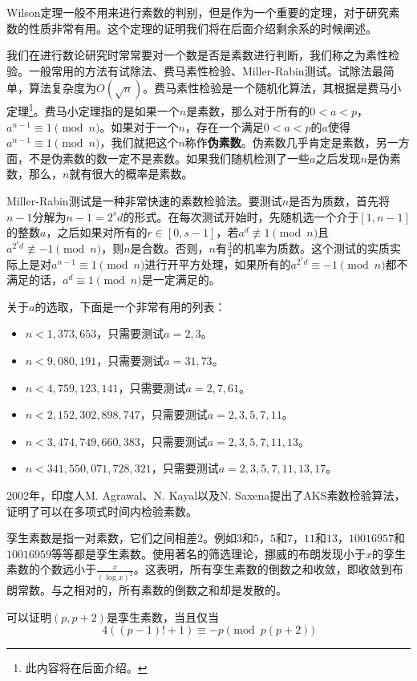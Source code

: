 \documentclass{ctexrep}
\newcommand{\bbold}[1]{\textbf{#1}}
\begin{document}
Wilson定理一般不用来进行素数的判别，但是作为一个重要的定理，对于研究素数的性质非常有用。这个定理的证明我们将在后面介绍剩余系的时候阐述。

我们在进行数论研究时常常要对一个数是否是素数进行判断，我们称之为素性检验。一般常用的方法有试除法、费马素性检验、Miller-Rabin测试。试除法最简单，算法复杂度为$O(\sqrt{n})$。费马素性检验是一个随机化算法，其根据是费马小定理\footnote{此内容将在后面介绍。}。费马小定理指的是如果一个$n$是素数，那么对于所有的$0<a<p$，$a^{n-1}\equiv 1\pmod{n}$。如果对于一个$n$，存在一个满足$0<a<p$的$a$使得$a^{n-1}\equiv 1\pmod{n}$，我们就把这个$n$称作\bbold{伪素数}。伪素数几乎肯定是素数，另一方面，不是伪素数的数一定不是素数。如果我们随机检测了一些$a$之后发现$n$是伪素数，那么，$n$就有很大的概率是素数。

Miller-Rabin测试是一种非常快速的素数检验法。要测试$n$是否为质数，首先将$n-1$分解为$n-1=2^sd$的形式。在每次测试开始时，先随机选一个介于$[1,n-1]$的整数$a$，之后如果对所有的$r \in [0,s-1]$，若$a^d \not\equiv 1\pmod{n}$且$a^{2^rd}\not\equiv -1\pmod{n}$，则$n$是合数。否则，$n$有$\frac{3}{4}$的机率为质数。这个测试的实质实际上是对$a^{n-1}\equiv 1\pmod{n}$进行开平方处理，如果所有的$a^{2^rd}\equiv -1\pmod{n}$都不满足的话，$a^d\equiv 1\pmod{n}$是一定满足的。

关于$a$的选取，下面是一个非常有用的列表：
\begin{itemize}
\item $n < 1,373,653$，只需要测试$a = 2, 3$。
\item $n < 9,080,191$，只需要测试$a = 31, 73$。
\item $n < 4,759,123,141$，只需要测试$a = 2, 7, 61$。
\item $n < 2,152,302,898,747$，只需要测试$a = 2, 3, 5, 7, 11$。
\item $n < 3,474,749,660,383$，只需要测试$a = 2, 3, 5, 7, 11, 13$。
\item $n < 341,550,071,728,321$，只需要测试$a = 2, 3, 5, 7, 11, 13, 17$。
\end{itemize}

2002年，印度人M. Agrawal、N. Kayal以及N. Saxena提出了AKS素数检验算法，证明了可以在多项式时间内检验素数。

孪生素数是指一对素数，它们之间相差$2$。例如$3$和$5$，$5$和$7$，$11$和$13$，$10016957$和$10016959$等等都是孪生素数。使用著名的筛选理论，挪威的布朗发现小于$x$的孪生素数的个数远小于$\frac{x}{(\log x)^2}$。这表明，所有孪生素数的倒数之和收敛，即收敛到布朗常数。与之相对的，所有素数的倒数之和却是发散的。

可以证明$(p,p+2)$是孪生素数，当且仅当
\begin{displaymath}
4((p-1)!+1)\equiv -p \pmod{p(p+2)}
\end{displaymath}
\end{document}
